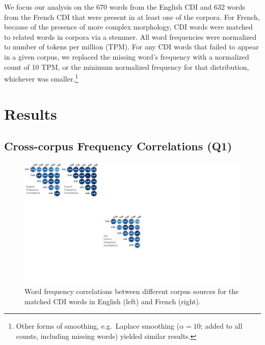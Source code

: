 \documentclass[10pt, letterpaper]{article}
\newenvironment{CodeChunk}{}{}
\begin{document}
We focus our analysis on the 670 words from the English CDI and 632
words from the French CDI that were present in at least one of the
corpora. For French, because of the presence of more complex morphology,
CDI words were matched to related words in corpora via a stemmer. All
word frequencies were normalized to number of tokens per million (TPM).
For any CDI words that failed to appear in a given corpus, we replaced
the missing word's frequency with a normalized count of 10 TPM, or the
minimum normalized frequency for that distribution, whichever was
smaller.\footnote{Other forms of smoothing, e.g.~Laplace smoothing
  (\(\alpha=10\); added to all counts, including missing words) yielded
  similar results.}

\hypertarget{results}{%
\section{Results}\label{results}}

\hypertarget{cross-corpus-frequency-correlations-q1}{%
\subsection{Cross-corpus Frequency Correlations
(Q1)}\label{cross-corpus-frequency-correlations-q1}}

\begin{CodeChunk}
\begin{figure}[t]

{\centering \includegraphics[width=\linewidth]{figs/corpus_freq_cors_hor} 

}

\caption[Word frequency correlations between different corpus sources for the matched CDI words in English (left) and French (right)]{Word frequency correlations between different corpus sources for the matched CDI words in English (left) and French (right).}\label{fig:fig1}
\end{figure}
\end{CodeChunk}
\end{document}
